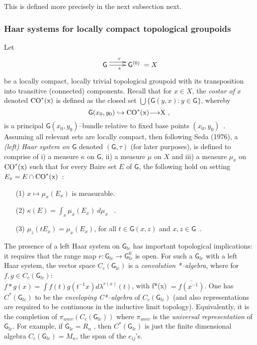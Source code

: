 \documentclass[12pt]{article}
\theoremstyle{plain}
\theoremstyle{definition}
\numberwithin{equation}{section}
\newcommand{\grp}{{\mathsf{G}}}
\newcommand{\med}{\medbreak}
\newcommand{\lra}{{\longrightarrow}}
\newcommand{\<}{{\langle}}
\begin{document}
 This is defined more precisely in the next subsection next.

\subsubsection{Haar systems for locally compact topological groupoids}

 Let
\begin{equation}
\xymatrix{ \grp \ar@<1ex>[r]^r \ar[r]_s & \grp^{(0)}}=X
\end{equation}
be a locally compact, locally trivial topological groupoid with
its transposition into transitive (connected) components. Recall
that for $x \in X$, the \emph{costar of $x$} denoted
$\rm{CO}^*(x)$ is defined as the closed set $\bigcup\{ \grp(y,x) :
y \in \grp \}$, whereby
\begin{equation}
\grp(x_0, y_0) \hookrightarrow \rm{CO}^*(x) \lra X~,
\end{equation}
is a principal $\grp(x_0, y_0)$--bundle relative to
fixed base points $(x_0, y_0)$~. Assuming all relevant sets are
locally compact, then following Seda (1976), a \emph{(left) Haar
system on $\grp$} denoted $(\grp, \tau)$ (for later purposes), is
defined to comprise of i) a measure $\kappa$ on $\grp$, ii) a
measure $\mu$ on $X$ and iii) a measure $\mu_x$ on $\rm{CO}^*(x)$
such that for every Baire set $E$ of $\grp$, the following hold on
setting $E_x = E \cap \rm{CO}^*(x)$~:
\begin{itemize}
\item[(1)] $x \mapsto \mu_x(E_x)$ is measurable.

\med
\item[(2)]
$\kappa(E) = \int_x \mu_x(E_x)~d\mu_x$ ~.

\med
\item[(3)]
$\mu_z(t E_x) = \mu_x(E_x)$, for all $t \in \grp(x,z)$ and $x, z
\in \grp$~.
\end{itemize}
\med

The presence of a left Haar system on $\grp_{lc}$ has important
topological implications: it requires that the range map $r :
\grp_{lc} \rightarrow \grp_{lc}^0$ is open. For such a $\grp_{lc}$
with a left Haar system, the vector space $C_c(\grp_{lc})$ is a
\textit{convolution} \textit{*--algebra}, where for $f, g \in
C_c(\grp_{lc})$: \\
\med
$f * g(x) = \int f(t)g(t^{-1} x) d \lambda^{r(x)} (t)$,  with
f*(x) $ = \overline{f(x^{-1})}$.
\med
One has $C^*(\grp_{lc})$ to be the \textit{enveloping C*--algebra}
of $C_c(\grp_{lc})$ (and also representations are required to be
continuous in the inductive limit topology). Equivalently, it is
the completion of $\pi_{univ}(C_c(\grp_{lc}))$ where $\pi_{univ}$
is the \textit{universal representation} of $\grp_{lc}$. For
example, if $ \grp_{lc} = R_n$ , then $C^*(\grp_{lc})$ is just the
finite dimensional algebra $C_c(\grp_{lc}) = M_n$, the span of the
$e_{ij}$'s.
\end{document}
